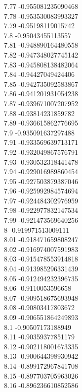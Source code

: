 {7.77	-0.955081235090468\\
7.78	-0.953530083993327\\
7.79	-0.95198119015742\\
7.8	-0.95043455113557\\
7.81	-0.948890164480558\\
7.82	-0.947348027745142\\
7.83	-0.945808138482064\\
7.84	-0.94427049424406\\
7.85	-0.942735092583867\\
7.86	-0.941201931054238\\
7.87	-0.939671007207952\\
7.88	-0.93814231859782\\
7.89	-0.936615862776695\\
7.9	-0.935091637297488\\
7.91	-0.933569639713171\\
7.92	-0.932049867576791\\
7.93	-0.930532318441478\\
7.94	-0.929016989860454\\
7.95	-0.927503879387046\\
7.96	-0.925992984574694\\
7.97	-0.924484302976959\\
7.98	-0.922977832147534\\
7.99	-0.921473569640256\\
8	-0.919971513009111\\
8.01	-0.918471659808247\\
8.02	-0.916974007591983\\
8.03	-0.915478553914818\\
8.04	-0.913985296331439\\
8.05	-0.912494232396735\\
8.06	-0.9110053596658\\
8.07	-0.909518675693948\\
8.08	-0.90803417803672\\
8.09	-0.906551864249893\\
8.1	-0.90507173188949\\
8.11	-0.90359377851179\\
8.12	-0.902118001673335\\
8.13	-0.900644398930942\\
8.14	-0.899172967841708\\
8.15	-0.897703705963026\\
8.16	-0.896236610852586\\
}
